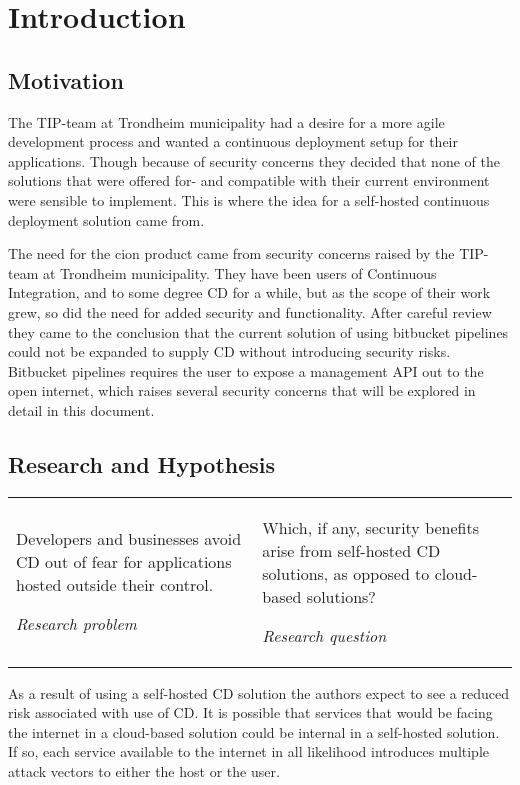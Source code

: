 \chapter{Introduction}
\label{chap:introduction}
\section{Motivation}
The TIP-team at Trondheim municipality had a desire for a more agile development process and wanted a continuous deployment setup for their applications. Though because of security concerns they decided that none of the solutions that were offered for- and compatible with their current environment were sensible to implement. This is where the idea for a self-hosted continuous deployment solution came from.

The need for the cion product came from security concerns raised by the TIP-team at Trondheim municipality. They have been users of Continuous Integration, and to some degree \acrfull{CD} for a while, but as the scope of their work grew, so did the need for added security and functionality. After careful review they came to the conclusion that the current solution of using bitbucket pipelines could not be expanded to supply \acrshort{CD} without introducing security risks. Bitbucket pipelines requires the user to expose a management API out to the open internet, which raises several security concerns that will be explored in detail in this document.

\section{Research and Hypothesis}
\begin{tabularx}{\linewidth}{X X}
    \epigraph{Developers and businesses avoid \acrshort{CD} out of fear for applications hosted outside their control.}{\textit{Research problem}}
    & \epigraph{Which, if any, security benefits arise from self-hosted \acrshort{CD} solutions, as opposed to cloud-based solutions?}{\textit{Research question}}
\end{tabularx}
As a result of using a self-hosted \acrshort{CD} solution the authors expect to see a reduced risk associated with use of \acrshort{CD}. It is possible that services that would be facing the internet in a cloud-based solution could be internal in a self-hosted solution. If so, each service available to the internet in all likelihood introduces multiple attack vectors to either the host or the user.

